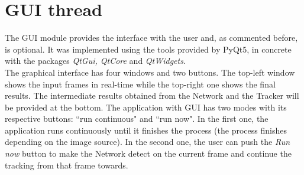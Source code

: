 \section{GUI thread}
The GUI module provides the interface with the user and, as commented before, is optional. It was implemented using the tools provided by PyQt5, in concrete with the packages \textit{QtGui, QtCore} and \textit{QtWidgets}.\\
The graphical interface has four windows and two buttons. The top-left window shows the input frames in real-time while the top-right one shows the final results. The intermediate results obtained from the Network and the Tracker will be provided at the bottom. The application with GUI has two modes with its respective buttons: ``run continuous" and ``run now". In the first one, the application runs continuously until it finishes the process (the process finishes depending on the image source). In the second one, the user can push the \textit{Run now} button to make the Network detect on the current frame and continue the tracking from that frame towards.

